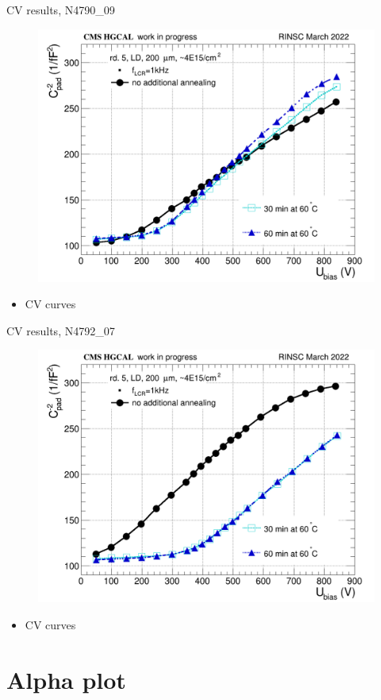 \documentclass{beamer}
\begin{document}
\begin{frame}{CV results, N4790\_09}
  \begin{figure}
      \includegraphics[width=.7\textwidth]{plots/annealing_CV_ch101_N4790_09.png}    
  \end{figure}
  \begin{itemize}
    \item CV curves
  \end{itemize}
\end{frame}

\begin{frame}{CV results, N4792\_07}
  \begin{figure}
      \includegraphics[width=.7\textwidth]{plots/annealing_CV_ch101_N4792_7.png}    
  \end{figure}
  \begin{itemize}
    \item CV curves
  \end{itemize}
\end{frame}






\section{Alpha plot}
\end{document}
